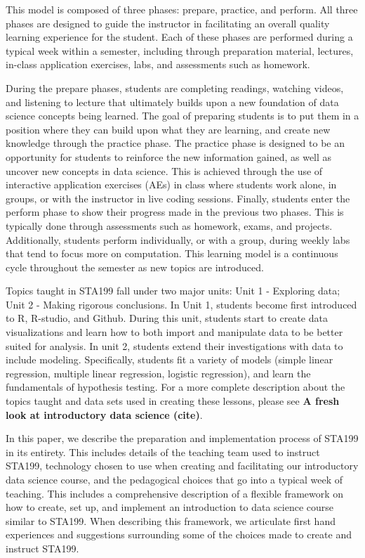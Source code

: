 \documentclass[
  12pt]{article}
\begin{document}
This model is composed of three phases: prepare, practice, and perform.
All three phases are designed to guide the instructor in facilitating an
overall quality learning experience for the student. Each of these
phases are performed during a typical week within a semester, including
through preparation material, lectures, in-class application exercises,
labs, and assessments such as homework.

During the prepare phases, students are completing readings, watching
videos, and listening to lecture that ultimately builds upon a new
foundation of data science concepts being learned. The goal of preparing
students is to put them in a position where they can build upon what
they are learning, and create new knowledge through the practice phase.
The practice phase is designed to be an opportunity for students to
reinforce the new information gained, as well as uncover new concepts in
data science. This is achieved through the use of interactive
application exercises (AEs) in class where students work alone, in
groups, or with the instructor in live coding sessions. Finally,
students enter the perform phase to show their progress made in the
previous two phases. This is typically done through assessments such as
homework, exams, and projects. Additionally, students perform
individually, or with a group, during weekly labs that tend to focus
more on computation. This learning model is a continuous cycle
throughout the semester as new topics are introduced.

Topics taught in STA199 fall under two major units: Unit 1 - Exploring
data; Unit 2 - Making rigorous conclusions. In Unit 1, students become
first introduced to R, R-studio, and Github. During this unit, students
start to create data visualizations and learn how to both import and
manipulate data to be better suited for analysis. In unit 2, students
extend their investigations with data to include modeling. Specifically,
students fit a variety of models (simple linear regression, multiple
linear regression, logistic regression), and learn the fundamentals of
hypothesis testing. For a more complete description about the topics
taught and data sets used in creating these lessons, please see
\textbf{A fresh look at introductory data science (cite)}.

In this paper, we describe the preparation and implementation process of
STA199 in its entirety. This includes details of the teaching team used
to instruct STA199, technology chosen to use when creating and
facilitating our introductory data science course, and the pedagogical
choices that go into a typical week of teaching. This includes a
comprehensive description of a flexible framework on how to create, set
up, and implement an introduction to data science course similar to
STA199. When describing this framework, we articulate first hand
experiences and suggestions surrounding some of the choices made to
create and instruct STA199.
\end{document}
